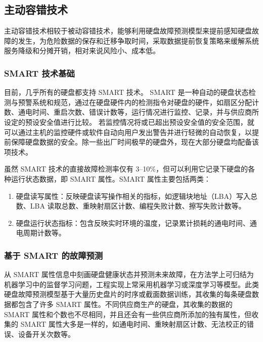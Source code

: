 \subsection{主动容错技术}

主动容错技术相较于被动容错技术，能够利用硬盘故障预测模型来提前感知硬盘故障的发生，为危险数据的保存和迁移争取时间，采取数据提前恢复策略来缓解系统服务降级和分摊开销，相对来说风险小、成本低。

\subsubsection{SMART 技术基础}

目前，几乎所有的硬盘都支持 SMART 技术。
SMART 是一种自动的硬盘状态检测与预警系统和规范，通过在硬盘硬件内的检测指令对硬盘的硬件，如扇区分配计数、通电时间、重启次数、错误计数等，运行情况进行监控、记录，并与供应商所设定的预设安全值进行比较。
若监控情况将或已超出预设安全值的安全范围，就可以通过主机的监控硬件或软件自动向用户发出警告并进行轻微的自动恢复，以提前保障硬盘数据的安全。除一些出厂时间极早的硬盘外，现在大部分硬盘均配备该项技术。

虽然 SMART 技术的直接故障检测率仅有 3--10\%，但可以利用它记录下硬盘的各种运行状态数据，即 SMART 属性。SMART 属性主要包括两类：

\begin{enumerate}
    \item 硬盘读写属性：反映硬盘读写操作相关的指标，如逻辑块地址（LBA）写入总数、LBA 读取总数、重映射扇区计数、编程失败计数、擦写失败计数等。
    
    \item 硬盘运行状态指标：包含反映实时环境的温度，记录累计损耗的通电时间、通电周期计数等。
\end{enumerate}

\subsubsection{基于 SMART 的故障预测}

从 SMART 属性信息中刻画硬盘健康状态并预测未来故障，在方法学上可归结为机器学习中的监督学习问题\cite{周志华2016机器学习,李航2012统计学习方法}，工程实现上常采用机器学习或深度学习等模型。此类硬盘故障预测模型基于大量历史盘片的时序或截面数据训练，其收集的每条硬盘数据都包含了许多 SMART 属性。不同供应商生产的硬盘，其收集的数据的 SMART 属性和个数也不尽相同，并且还会有一些供应商所添加的独有属性，但收集的 SMART 属性大多是一样的，如通电时间、重映射扇区计数、无法校正的错误、设备开关次数等。

